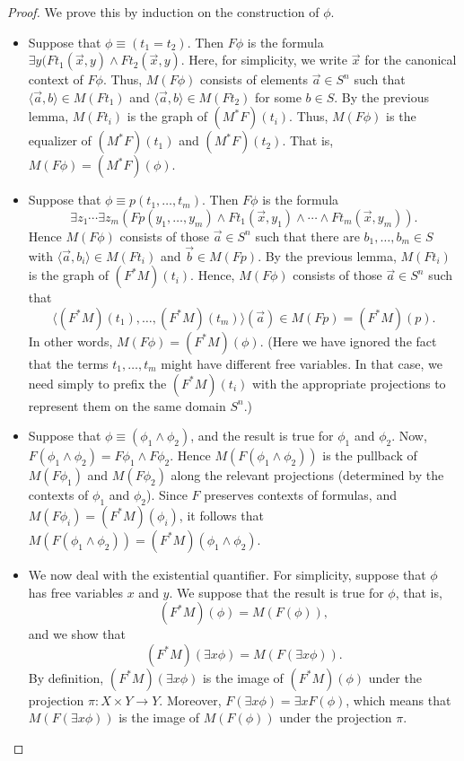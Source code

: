 \begin{proof} We prove this by induction on the construction of
  $\phi$. \begin{itemize}
  \item Suppose that $\phi\equiv (t_1=t_2)$.  Then $F\phi$ is the
    formula $\exists y(Ft_1(\vec{x},y)\wedge Ft_2(\vec{x},y)$.  Here,
    for simplicity, we write $\vec{x}$ for the canonical context of
    $F\phi$.  Thus, $M(F\phi )$ consists of elements $\vec{a}\in S^n$
    such that $\langle \vec{a},b\rangle \in M(Ft_1)$ and
    $\langle \vec{a},b\rangle \in M(Ft_2)$ for some $b\in S$.  By the
    previous lemma, $M(Ft_i)$ is the graph of $(M^*F)(t_i)$.  Thus,
    $M(F\phi )$ is the equalizer of $(M^*F)(t_1)$ and $(M^*F)(t_2)$.
    That is, $M(F\phi )=(M^*F)(\phi )$.

 \item Suppose that $\phi\equiv p(t_1,\dots ,t_m)$.  Then $F\phi$ is
   the formula
   \[ \exists z_1\cdots \exists z_m(Fp(y_1,\dots ,y_m)\wedge
     Ft_1(\vec{x},y_1)\wedge\cdots\wedge Ft_m(\vec{x},y_m)) .\] Hence
   $M(F\phi )$ consists of those $\vec{a}\in S^n$ such that there are
   $b_1,\dots ,b_m\in S$ with $\langle \vec{a},b_i\rangle \in M(Ft_i)$
   and $\vec{b}\in M(Fp)$.  By the previous lemma, $M(Ft_i)$ is the
   graph of $(F^*M)(t_i)$.  Hence, $M(F\phi )$ consists of those
   $\vec{a}\in S^n$ such that
   \[ \langle (F^*M)(t_1),\dots ,(F^*M)(t_m)\rangle (\vec{a}) \in
     M(Fp) = (F^*M)(p) .\] In other words, $M(F\phi )=(F^*M)(\phi )$.
   (Here we have ignored the fact that the terms $t_1,\dots ,t_m$
   might have different free variables.  In that case, we need simply
   to prefix the $(F^*M)(t_i)$ with the appropriate projections to
   represent them on the same domain $S^n$.)

 \item Suppose that $\phi\equiv (\phi _1\wedge \phi _2)$, and the
   result is true for $\phi _1$ and $\phi _2$.  Now,
   $F(\phi _1\wedge \phi _2)=F\phi _1\wedge F\phi _2$.  Hence
   $M(F(\phi _1\wedge \phi _2))$ is the pullback of $M(F\phi _1)$ and
   $M(F\phi _2)$ along the relevant projections (determined by the
   contexts of $\phi _1$ and $\phi _2$).  Since $F$ preserves contexts
   of formulas, and $M(F\phi _i)=(F^*M)(\phi _i)$, it follows that
   $M(F(\phi _1\wedge \phi _2))=(F^*M)(\phi _1\wedge \phi _2)$.

 \item We now deal with the existential quantifier.  For simplicity,
   suppose that $\phi$ has free variables $x$ and $y$.  We suppose
   that the result is true for $\phi$, that is,
   \[ (F^*M)(\phi )=M(F(\phi)) ,\] and we show that 
   \[ (F^*M)(\exists x\phi )=M(F(\exists x\phi )) .\] By definition,
   $(F^*M)(\exists x\phi )$ is the image of $(F^*M)(\phi )$ under the
   projection $\pi :X\times Y\to Y$.  Moreover,
   $F(\exists x\phi )=\exists xF(\phi )$, which means that
   $M(F(\exists x\phi ))$ is the image of $M(F(\phi ))$ under the
   projection $\pi$.
    \end{itemize}
  \end{proof}

